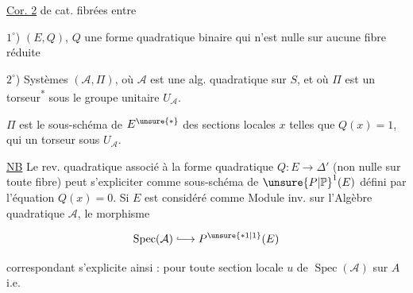 
\uline{Cor. 2}  de cat. fibrées entre

$1^\circ$) $(E,Q)$, $Q$ une forme quadratique binaire qui n'est nulle sur aucune fibre réduite

$2^\circ$) Systèmes $(\mathcal A,\Pi)$, où $\mathcal A$ est une alg. quadratique sur $S$, et où $\Pi$ est un torseur\textsuperscript{*} sous le groupe unitaire $U_{\mathcal A}$. \deleted{\unsure{*}}


$\Pi$ est le sous-schéma de $E^{\unsure{*}}$ des sections locales $x$ telles que $Q(x)=1$, qui  un torseur sous $U_{\mathcal A}$.

\uline{NB} Le rev. quadratique associé à la forme quadratique $Q:E\longrightarrow\Delta'$ (non nulle sur toute fibre) peut s'expliciter comme  sous-schéma de ${\unsure{P|\mathbb P}}^1(E)$ défini par l'équation $Q(x)=0$. Si $E$ est considéré comme Module inv. sur l'Algèbre quadratique $\mathcal A$, le morphisme

\[
\operatorname{Spec}(\mathcal A)\lhook\joinrel\longrightarrow{P}^{\unsure{*1|1}}(E)
\]

correspondant  s'explicite ainsi : pour toute section locale $u$ de $\operatorname{Spec}(\mathcal A)$ sur $A$ i.e.
